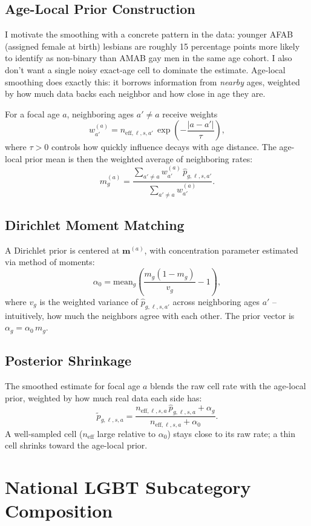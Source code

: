 \documentclass[11pt]{article}
\begin{document}
\subsection{Age-Local Prior Construction}

I motivate the smoothing with a concrete pattern in the data: younger
AFAB (assigned female at birth) lesbians are roughly 15 percentage points
more likely to identify as non-binary than AMAB gay men in the same age
cohort. I also don't want a single noisy exact-age cell to dominate the
estimate. Age-local smoothing does exactly this: it borrows
information from \emph{nearby} ages, weighted by how much data backs each
neighbor and how close in age they are.

For a focal age $a$, neighboring ages $a' \neq a$ receive weights
\[
w_{a'}^{(a)} =
n_{\text{eff},\ell,s,a'}\,
\exp\!\left(-\frac{|a-a'|}{\tau}\right),
\]
where $\tau > 0$ controls how quickly influence decays with age distance.
The age-local prior mean is then the weighted average of neighboring rates:
\[
m_g^{(a)} =
\frac{\sum_{a' \neq a} w_{a'}^{(a)}\, \hat{p}_{g,\ell,s,a'}}
{\sum_{a' \neq a} w_{a'}^{(a)}}.
\]

\subsection{Dirichlet Moment Matching}

A Dirichlet prior is centered at $\mathbf{m}^{(a)}$, with concentration
parameter estimated via method of moments:
\[
\alpha_0 =
\text{mean}_g\!\left(\frac{m_g(1-m_g)}{v_g} - 1\right),
\]
where $v_g$ is the weighted variance of $\hat p_{g,\ell,s,a'}$ across
neighboring ages $a'$ -- intuitively, how much the neighbors agree with
each other. The prior vector is $\alpha_g = \alpha_0\, m_g$.

\subsection{Posterior Shrinkage}

The smoothed estimate for focal age $a$ blends the raw cell rate with the
age-local prior, weighted by how much real data each side has:
\[
\tilde{p}_{g,\ell,s,a}
=
\frac{n_{\text{eff},\ell,s,a}\,\hat{p}_{g,\ell,s,a} + \alpha_g}
{n_{\text{eff},\ell,s,a} + \alpha_0}.
\]
A well-sampled cell ($n_{\text{eff}}$ large relative to $\alpha_0$) stays
close to its raw rate; a thin cell shrinks toward the age-local prior.

\section{National LGBT Subcategory Composition}
\label{sec:crossstate}
\end{document}
